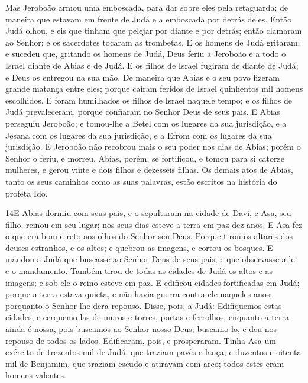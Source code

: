Mas Jeroboão armou uma emboscada, para dar sobre eles pela
retaguarda; de maneira que estavam em frente de Judá e a emboscada
por detrás deles. Então Judá olhou, e eis que tinham que
pelejar por diante e por detrás; então clamaram ao Senhor; e os
sacerdotes tocaram as trombetas. E os homens de Judá
gritaram; e sucedeu que, gritando os homens de Judá, Deus feriu a
Jeroboão e a todo o Israel diante de Abias e de Judá. E os
filhos de Israel fugiram de diante de Judá; e Deus os entregou na
sua mão.
 De maneira que Abias e o seu povo fizeram grande matança entre
eles; porque caíram feridos de Israel quinhentos mil homens
escolhidos. E foram humilhados os filhos de Israel naquele
tempo; e os filhos de Judá prevaleceram, porque confiaram no Senhor
Deus de seus pais. E Abias perseguiu Jeroboão; e tomou-lhe a
Betel com os lugares da sua jurisdição, e a Jesana com os lugares da
sua jurisdição, e a Efrom com os lugares da sua jurisdição. E
Jeroboão não recobrou mais o seu poder nos dias de Abias; porém o
Senhor o feriu, e morreu. Abias, porém, se fortificou, e
tomou para si catorze mulheres, e gerou vinte e dois filhos e
dezesseis filhas. Os demais atos de Abias, tanto os seus
caminhos como as suas palavras, estão escritos na história do
profeta Ido.

\medskip

\lettrine{14} E Abias dormiu com seus pais, e o sepultaram na
cidade de Davi, e Asa, seu filho, reinou em seu lugar; nos seus dias
esteve a terra em paz dez anos. E Asa fez o que era bom e reto
aos olhos do Senhor seu Deus. Porque tirou os altares dos deuses
estranhos, e os altos; e quebrou as imagens, e cortou os bosques.
E mandou a Judá que buscasse ao Senhor Deus de seus pais, e que
observasse a lei e o mandamento. Também tirou de todas as
cidades de Judá os altos e as imagens; e sob ele o reino esteve em
paz. E edificou cidades fortificadas em Judá; porque a terra
estava quieta, e não havia guerra contra ele naqueles anos;
porquanto o Senhor lhe dera repouso. Disse, pois, a Judá:
Edifiquemos estas cidades, e cerquemo-las de muros e torres, portas
e ferrolhos, enquanto a terra ainda é nossa, pois buscamos ao Senhor
nosso Deus; buscamo-lo, e deu-nos repouso de todos os lados.
Edificaram, pois, e prosperaram. Tinha Asa um exército de
trezentos mil de Judá, que traziam pavês e lança; e duzentos e
oitenta mil de Benjamim, que traziam escudo e atiravam com arco;
todos estes eram homens valentes.

